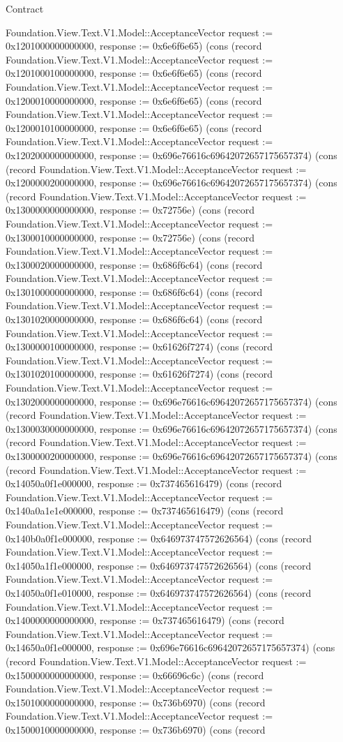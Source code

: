 \begin{lexlean}{Contract}
\begin{semanticmodule}
{Foundation.View.Text.V1.Model::AcceptanceVector {request := 0x1201000000000000, response := 0x6e6f6e65}) (cons (record Foundation.View.Text.V1.Model::AcceptanceVector {request := 0x1201000100000000, response := 0x6e6f6e65}) (cons (record Foundation.View.Text.V1.Model::AcceptanceVector {request := 0x1200010000000000, response := 0x6e6f6e65}) (cons (record Foundation.View.Text.V1.Model::AcceptanceVector {request := 0x1200010100000000, response := 0x6e6f6e65}) (cons (record Foundation.View.Text.V1.Model::AcceptanceVector {request := 0x1202000000000000, response := 0x696e76616c69642072657175657374}) (cons (record Foundation.View.Text.V1.Model::AcceptanceVector {request := 0x1200000200000000, response := 0x696e76616c69642072657175657374}) (cons (record Foundation.View.Text.V1.Model::AcceptanceVector {request := 0x1300000000000000, response := 0x72756e}) (cons (record Foundation.View.Text.V1.Model::AcceptanceVector {request := 0x1300010000000000, response := 0x72756e}) (cons (record Foundation.View.Text.V1.Model::AcceptanceVector {request := 0x1300020000000000, response := 0x686f6c64}) (cons (record Foundation.View.Text.V1.Model::AcceptanceVector {request := 0x1301000000000000, response := 0x686f6c64}) (cons (record Foundation.View.Text.V1.Model::AcceptanceVector {request := 0x1301020000000000, response := 0x686f6c64}) (cons (record Foundation.View.Text.V1.Model::AcceptanceVector {request := 0x1300000100000000, response := 0x61626f7274}) (cons (record Foundation.View.Text.V1.Model::AcceptanceVector {request := 0x1301020100000000, response := 0x61626f7274}) (cons (record Foundation.View.Text.V1.Model::AcceptanceVector {request := 0x1302000000000000, response := 0x696e76616c69642072657175657374}) (cons (record Foundation.View.Text.V1.Model::AcceptanceVector {request := 0x1300030000000000, response := 0x696e76616c69642072657175657374}) (cons (record Foundation.View.Text.V1.Model::AcceptanceVector {request := 0x1300000200000000, response := 0x696e76616c69642072657175657374}) (cons (record Foundation.View.Text.V1.Model::AcceptanceVector {request := 0x14050a0f1e000000, response := 0x737465616479}) (cons (record Foundation.View.Text.V1.Model::AcceptanceVector {request := 0x140a0a1e1e000000, response := 0x737465616479}) (cons (record Foundation.View.Text.V1.Model::AcceptanceVector {request := 0x140b0a0f1e000000, response := 0x646973747572626564}) (cons (record Foundation.View.Text.V1.Model::AcceptanceVector {request := 0x14050a1f1e000000, response := 0x646973747572626564}) (cons (record Foundation.View.Text.V1.Model::AcceptanceVector {request := 0x14050a0f1e010000, response := 0x646973747572626564}) (cons (record Foundation.View.Text.V1.Model::AcceptanceVector {request := 0x1400000000000000, response := 0x737465616479}) (cons (record Foundation.View.Text.V1.Model::AcceptanceVector {request := 0x14650a0f1e000000, response := 0x696e76616c69642072657175657374}) (cons (record Foundation.View.Text.V1.Model::AcceptanceVector {request := 0x1500000000000000, response := 0x66696c6c}) (cons (record Foundation.View.Text.V1.Model::AcceptanceVector {request := 0x1501000000000000, response := 0x736b6970}) (cons (record Foundation.View.Text.V1.Model::AcceptanceVector {request := 0x1500010000000000, response := 0x736b6970}) (cons (record }
\end{semanticmodule}
\end{lexlean}
